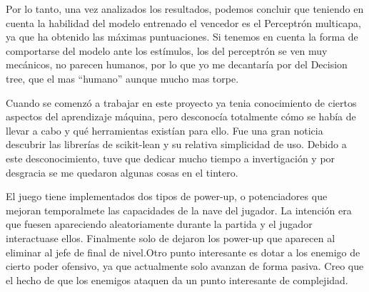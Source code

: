Por lo tanto, una vez analizados los resultados, podemos concluir que teniendo en cuenta la habilidad del modelo entrenado el vencedor es el Perceptrón multicapa, ya que ha obtenido las máximas puntuaciones. Si tenemos en cuenta la forma de comportarse del modelo ante los estímulos, los del perceptrón se ven muy mecánicos, no parecen humanos, por lo que yo me decantaría por del Decision tree, que el mas  ``humano'' aunque mucho mas torpe.


Cuando se comenzó a trabajar en este proyecto ya tenia conocimiento de ciertos aspectos del aprendizaje máquina, pero desconocía totalmente cómo se había de llevar a cabo y qué herramientas existían para ello. Fue una gran noticia descubrir las librerías de scikit-lean y su relativa simplicidad de uso. Debido a este desconocimiento, tuve que dedicar mucho tiempo a invertigación y por desgracia se me quedaron algunas cosas en el tintero. 

El juego tiene implementados dos tipos de power-up, o potenciadores que mejoran temporalmete las capacidades de la nave del jugador. La intención era que fuesen apareciendo aleatoriamente durante la partida y el jugador interactuase ellos. Finalmente solo de dejaron los power-up que aparecen al eliminar al jefe de final de nivel.Otro punto interesante es dotar a los enemigo de cierto poder ofensivo, ya que actualmente solo avanzan de forma pasiva. Creo que el hecho de que los enemigos ataquen da un punto interesante de complejidad.